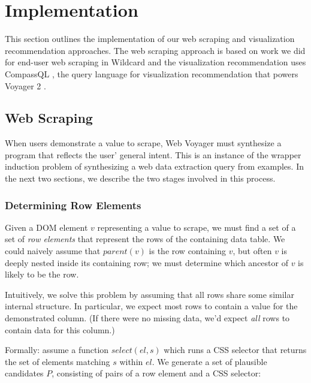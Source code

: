\documentclass[sigconf,screen]{acmart}
\begin{document}
\hypertarget{sec:implementation}{%
\section{Implementation}\label{sec:implementation}}

This section outlines the implementation of our web scraping and
visualization recommendation approaches. The web scraping approach is
based on work we did for end-user web scraping in Wildcard
\citep{litt2020} and the visualization recommendation uses CompassQL
\citep{wongsuphasawat2016}, the query language for visualization
recommendation that powers Voyager 2 \citep{wongsuphasawat2017}.

\hypertarget{web-scraping}{%
\subsection{Web Scraping}\label{web-scraping}}

When users demonstrate a value to scrape, Web Voyager must synthesize a
program that reflects the user' general intent. This is an instance of
the wrapper induction \citep{kushmerick2000} problem of synthesizing a
web data extraction query from examples. In the next two sections, we
describe the two stages involved in this process.

\hypertarget{determining-row-elements}{%
\subsubsection{Determining Row
Elements}\label{determining-row-elements}}

Given a DOM element \(v\) representing a value to scrape, we must find a
set of a set of \emph{row elements} that represent the rows of the
containing data table. We could naively assume that \(parent(v)\) is the
row containing \(v\), but often \(v\) is deeply nested inside its
containing row; we must determine which ancestor of \(v\) is likely to
be the row.

Intuitively, we solve this problem by assuming that all rows share some
similar internal structure. In particular, we expect most rows to
contain a value for the demonstrated column. (If there were no missing
data, we'd expect \emph{all} rows to contain data for this column.)

Formally: assume a function \(select(el, s)\) which runs a CSS selector
that returns the set of elements matching \(s\) within \(el\). We
generate a set of plausible candidates \(P\), consisting of pairs of a
row element and a CSS selector:
\end{document}
